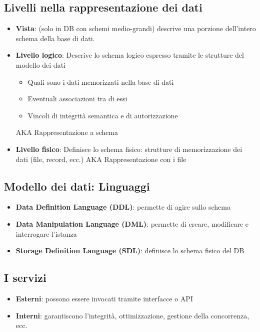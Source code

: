 \documentclass[12pt]{article}
\begin{document}
\subsection{Livelli nella rappresentazione dei dati}
\begin{itemize}
    \setlength\itemsep{0em}
    \item \textbf{Vista}: (solo in DB con schemi medio-grandi) descrive una porzione dell'intero schema della base di dati.
    \item \textbf{Livello logico}: Descrive lo schema logico espresso tramite le strutture del modello dei dati\begin{itemize}
        \item Quali sono i dati memorizzati nella base di dati
        \item Eventuali associazioni tra di essi
        \item Vincoli di integrità semantica e di autorizzazione
        
    \end{itemize}
    AKA Rappresentazione a schema 
    \item \textbf{Livello fisico}: Definisce lo schema fisico: strutture di memorizzazione dei dati (file, record, ecc.)
    AKA Rappresentazione con i file
\end{itemize}
\subsection{Modello dei dati: Linguaggi}
\begin{itemize}
    \item \textbf{Data Definition Language (DDL)}: permette di agire sullo schema
    \item \textbf{Data Manipulation Language (DML)}: permette di creare, modificare e interrogare l'istanza
    \item \textbf{Storage Definition Language (SDL)}: definisce lo schema fisico del DB
\end{itemize}
\subsection{I servizi}
\begin{itemize}
    \item \textbf{Esterni}: possono essere invocati tramite interfacce o API
    \item \textbf{Interni}: garantiscono l'integrità, ottimizzazione, gestione della concorrenza, ecc.
\end{itemize}
\end{document}
